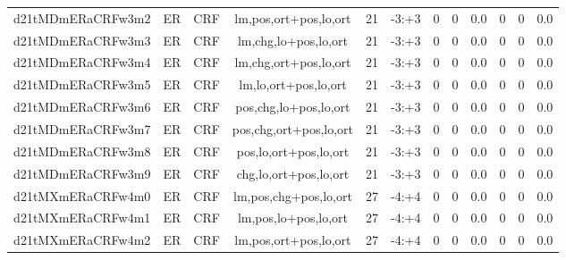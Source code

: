 \documentclass[a4paper]{article}
\begin{document}
\begin{landscape}
\begin{center}
\begin{tabular}{ |c|c|c|c|c|c|c|c|c|c|c|c|}
 
 	
 	\small{ d21tMDmERaCRFw3m2 } & ER & CRF & lm,pos,ort+pos,lo,ort  &  21 &  -3:+3  &  0 & 0 & 0.0  &  0 & 0 & 0.0 \\
 	

 
 	
 	\small{ d21tMDmERaCRFw3m3 } & ER & CRF & lm,chg,lo+pos,lo,ort  &  21 &  -3:+3  &  0 & 0 & 0.0  &  0 & 0 & 0.0 \\
 	

 
 	
 	\small{ d21tMDmERaCRFw3m4 } & ER & CRF & lm,chg,ort+pos,lo,ort  &  21 &  -3:+3  &  0 & 0 & 0.0  &  0 & 0 & 0.0 \\
 	

 
 	
 	\small{ d21tMDmERaCRFw3m5 } & ER & CRF & lm,lo,ort+pos,lo,ort  &  21 &  -3:+3  &  0 & 0 & 0.0  &  0 & 0 & 0.0 \\
 	

 
 	
 	\small{ d21tMDmERaCRFw3m6 } & ER & CRF & pos,chg,lo+pos,lo,ort  &  21 &  -3:+3  &  0 & 0 & 0.0  &  0 & 0 & 0.0 \\
 	

 
 	
 	\small{ d21tMDmERaCRFw3m7 } & ER & CRF & pos,chg,ort+pos,lo,ort  &  21 &  -3:+3  &  0 & 0 & 0.0  &  0 & 0 & 0.0 \\
 	

 
 	
 	\small{ d21tMDmERaCRFw3m8 } & ER & CRF & pos,lo,ort+pos,lo,ort  &  21 &  -3:+3  &  0 & 0 & 0.0  &  0 & 0 & 0.0 \\
 	

 
 	
 	\small{ d21tMDmERaCRFw3m9 } & ER & CRF & chg,lo,ort+pos,lo,ort  &  21 &  -3:+3  &  0 & 0 & 0.0  &  0 & 0 & 0.0 \\
 	

 
 	
 	\small{ d21tMXmERaCRFw4m0 } & ER & CRF & lm,pos,chg+pos,lo,ort  &  27 &  -4:+4  &  0 & 0 & 0.0  &  0 & 0 & 0.0 \\
 	

 
 	
 	\small{ d21tMXmERaCRFw4m1 } & ER & CRF & lm,pos,lo+pos,lo,ort  &  27 &  -4:+4  &  0 & 0 & 0.0  &  0 & 0 & 0.0 \\
 	

 
 	
 	\small{ d21tMXmERaCRFw4m2 } & ER & CRF & lm,pos,ort+pos,lo,ort  &  27 &  -4:+4  &  0 & 0 & 0.0  &  0 & 0 & 0.0 \\
 	


\end{tabular}
\end{center}
\end{landscape}
\end{document}

